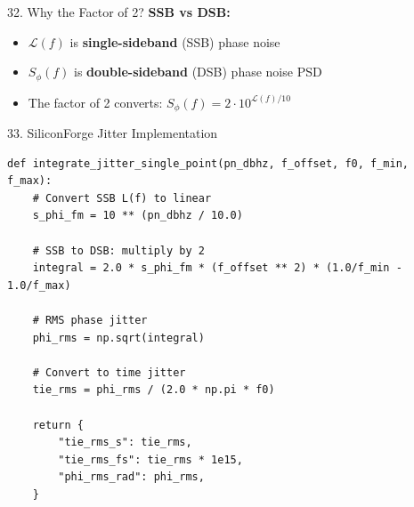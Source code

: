 \documentclass[aspectratio=169, 11pt]{beamer}
\begin{document}
\begin{frame}{32. Why the Factor of 2?}
    \textbf{SSB vs DSB:}

    \vspace{0.5em}
    \begin{itemize}
        \item $\mathcal{L}(f)$ is \textbf{single-sideband} (SSB) phase noise
        \item $S_\phi(f)$ is \textbf{double-sideband} (DSB) phase noise PSD
        \item The factor of 2 converts: $S_\phi(f) = 2 \cdot 10^{\mathcal{L}(f)/10}$
    \end{itemize}

    \vspace{0.5em}
    \begin{center}
    \end{center}
\end{frame}

\begin{frame}{33. SiliconForge Jitter Implementation}
    \begin{lstlisting}
def integrate_jitter_single_point(pn_dbhz, f_offset, f0, f_min, f_max):
    # Convert SSB L(f) to linear
    s_phi_fm = 10 ** (pn_dbhz / 10.0)

    # SSB to DSB: multiply by 2
    integral = 2.0 * s_phi_fm * (f_offset ** 2) * (1.0/f_min - 1.0/f_max)

    # RMS phase jitter
    phi_rms = np.sqrt(integral)

    # Convert to time jitter
    tie_rms = phi_rms / (2.0 * np.pi * f0)

    return {
        "tie_rms_s": tie_rms,
        "tie_rms_fs": tie_rms * 1e15,
        "phi_rms_rad": phi_rms,
    }
    \end{lstlisting}
\end{frame}
\end{document}
